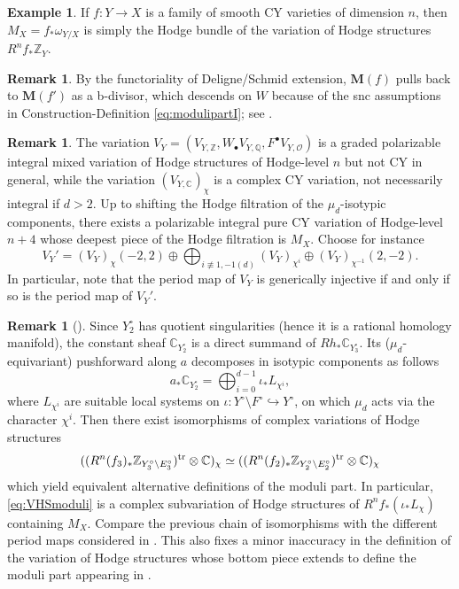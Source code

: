 \documentclass{amsart}
\theoremstyle{definition}
\newtheorem{example}[theorem]{Example}
\newtheorem{remark}[theorem]{Remark}
\theoremstyle{remark}
\def\bZ{\mathbb{Z}}
\def\bQ{\mathbb{Q}}
\def\bC{\mathbb{C}}
\def\cO{\mathcal{O}}
\newcommand\bfM{{\bf M}}
\def\bfM{\mathbf{M}}
\numberwithin{equation}{section}
\begin{document}
\begin{example} 
    If $f \colon Y \to X$ is a family of smooth CY varieties of dimension $n$, then $M_{X} = f_* \omega_{Y/X}$ is simply the Hodge bundle of the variation of Hodge structures $R^nf_*\bZ_Y$. 
\end{example}

\begin{remark}\label{functoriality}
By the functoriality of Deligne/Schmid extension, $\bfM(f)$ pulls back to $\bfM (f')$ as a  b-divisor, which descends on $W$ because of the snc assumptions in Construction-Definition \ref{eq:modulipartI}; see \cite[\S 8.4.8]{Koll07}.
\end{remark}

\begin{remark}\label{rmk:rationalCY} 
The variation
$V_Y=(V_{Y,\bZ},W_\bullet V_{Y,\bQ},F^\bullet V_{Y,\cO})$ is a graded polarizable integral mixed variation of Hodge structures of Hodge-level $n$ but not CY in general, while the variation $(V_{Y,\bC})_{\chi}$ is a complex CY variation, not necessarily integral if $d>2$. Up to shifting the Hodge filtration of the $\mu_d$-isotypic components, there exists a polarizable integral pure CY variation of Hodge-level $n+4$ whose deepest piece of the Hodge filtration is $M_X$. Choose for instance 
\[V_{Y}'=(V_Y)_{\chi}(-2,2)\oplus \bigoplus_{i\not\equiv 1,-1 (d)} (V_Y)_{\chi^i}\oplus (V_Y)_{\chi^{-1}}(2,-2).\]
In particular, note that the period map of $V_{Y}$ is generically injective if and only if so is the period map of $V_{Y}'$. 
\end{remark} 


\begin{remark}[]\label{rmk:moduli}
Since $Y^{\circ}_2$ has quotient singularities (hence it is a rational homology manifold), the constant sheaf $\bC_{Y^{\circ}_2}$ is a direct summand of $Rh_* \bC_{Y^{\circ}_3}$. Its ($\mu_d$-equivariant) pushforward along $a$ decomposes in isotypic components as follows
\begin{equation}\label{eq:splitIC}
a_*\bC_{Y^{\circ}_2} = \bigoplus^{d-1}_{i=0} \iota_*L_{\chi^{i}},
\end{equation}
where $L_{\chi^{i}}$ are suitable local systems on $\iota \colon Y^{\circ} \setminus F^{\circ} \hookrightarrow Y^{\circ}$, on which $\mu_d$ acts via the character $\chi^i$. 
Then there exist isomorphisms of complex  variations of Hodge structures
\begin{equation}\label{eq:VHSmoduli}
((R^{n}(f_3)_*\bZ_{Y^{\circ}_{3} \setminus E^{\circ}_{3}})^{\rm tr} \otimes \bC)_{\chi} 
\simeq 
((R^{n}(f_2)_*\bZ_{Y^{\circ}_{2} \setminus E^{\circ}_{2}})^{\rm tr}\otimes \bC)_{\chi} 
\end{equation}
which yield equivalent alternative definitions of the moduli part. In particular, \eqref{eq:VHSmoduli} is a complex subvariation of Hodge structures of $R^n f_* (\iota_*L_{\chi})$ containing $M_X$. 
Compare the previous chain of isomorphisms with the different period maps considered in \cite{Amb05}. This also fixes a minor inaccuracy in the definition of the variation of Hodge structures whose bottom piece extends to define the moduli part appearing in \cite[Def. (8.4.6)]{Koll07}.
\end{remark}
\end{document}
